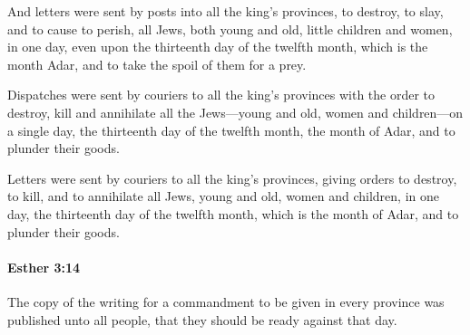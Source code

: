 \begin{versebox}
					\item[ASV] And letters were sent by posts into all the king's provinces, to destroy, to slay, and to cause to perish, all Jews, both young and old, little children and women, in one day, even upon the thirteenth day of the twelfth month, which is the month Adar, and to take the spoil of them for a prey.
					\item[NIV] Dispatches were sent by couriers to all the king’s provinces with the order to destroy, kill and annihilate all the Jews—young and old, women and children—on a single day, the thirteenth day of the twelfth month, the month of Adar, and to plunder their goods.
					\item[NRSV] Letters were sent by couriers to all the king’s provinces, giving orders to destroy, to kill, and to annihilate all Jews, young and old, women and children, in one day, the thirteenth day of the twelfth month, which is the month of Adar, and to plunder their goods.
			\end{versebox}

		\paragraph{Esther 3:14} %
			\label{ESTHER-3-14}

			The copy of the writing for a commandment to be given in every province was published unto all people, that they should be ready against that day.

